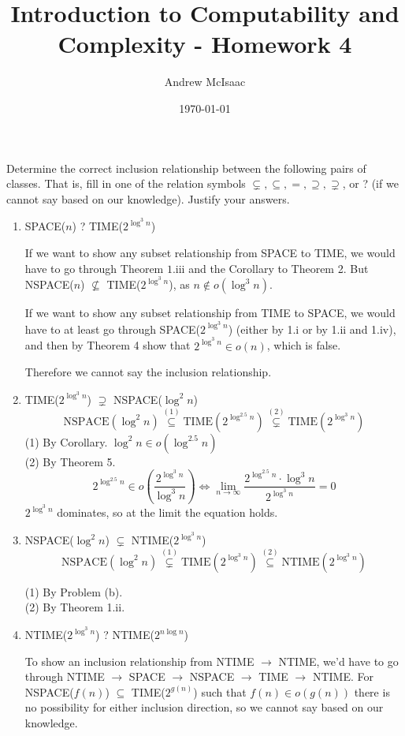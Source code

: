 \documentclass[a4paper]{article}
\title{Introduction to Computability and Complexity - Homework 4}
\date{\today}
\author{Andrew McIsaac}
\begin{document}
\maketitle

Determine the correct inclusion relationship between the following pairs of
classes. That is, fill in one of the relation symbols $\subsetneq, \subseteq, =,
\supseteq, \supsetneq$, or ? (if we cannot say based on our knowledge). Justify
your answers.
\begin{enumerate}[label=(\alph*)] 

	\item SPACE($n$) ? TIME($2^{\log^{3}n}$)

		If we want to show any subset relationship from SPACE to TIME, we would
		have to go through Theorem $1.\text{iii}$ and the Corollary to Theorem
		2. But NSPACE($n$) $\not\subseteq$ TIME($2^{\log^{3}n}$), as $n \notin
		o(\log^{3}n)$.

		If we want to show any subset relationship from TIME to SPACE, we would
		have to at least go through SPACE($2^{\log^{3}n}$) (either by 1.i or by
		1.ii and 1.iv), and then by Theorem 4 show that
		$2^{\log^{3}n} \in o(n)$, which is false.

		Therefore we cannot say the inclusion relationship.

	\item TIME($2^{\log^{3}n}$) $\supsetneq$ NSPACE($\log^{2}n$)
		$$
		\text{NSPACE}(\log^{2}n) \overset{(1)}{\subseteq} 
		\text{TIME}(2^{\log^{2.5}n})
		\overset{(2)}{\subsetneq} \text{TIME}(2^{\log^{3}n})
		$$
		(1) By Corollary. $\log^{2}n \in o(\log^{2.5}n)$ \\
		(2) By Theorem 5. 
		$$
		2^{\log^{2.5}n} \in o\left(\frac{2^{\log^3n}}{\log^3n}\right)
		\iff 
		\lim_{n \to \infty} \frac{2^{\log^{2.5}n} \cdot \log^3n}{2^{\log^3n}}=0
		$$
		$2^{\log^3n}$ dominates, so at the limit the equation holds.

	\item NSPACE($\log^{2}n$) $\subsetneq$ NTIME($2^{\log^{3}n}$)
		$$
		\text{NSPACE}(\log^2n)\overset{(1)}{\subsetneq} \text{TIME}(2^{\log^3n})
		\overset{(2)}{\subseteq} \text{NTIME}(2^{\log^3n})
		$$

		(1) By Problem (b). \\
		(2) By Theorem 1.ii. 

	\item NTIME($2^{\log^{3}n}$) ? NTIME($2^{n\log n}$)
		
		To show an inclusion relationship from NTIME $\to$ NTIME, we'd have to
		go through NTIME $\to$ SPACE $\to$ NSPACE $\to$ TIME $\to$ NTIME. For
		NSPACE($f(n)$) $\subseteq$ TIME($2^{g(n)}$) such that $f(n) \in o(g(n))$
		there is no possibility for either inclusion direction, so we cannot say
		based on our knowledge.


\end{enumerate}
\end{document}

